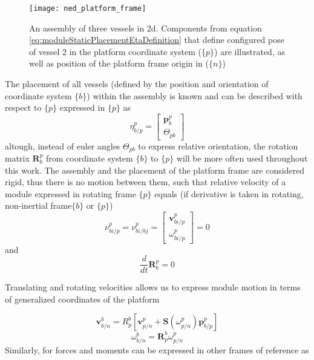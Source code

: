 \begin{figure}[H]
	\centering
	\texttt{[image: ned\_platform\_frame]}
	\caption{An assembly of three vessels in 2d. Components from equation \ref{eq:moduleStaticPlacementEtaDefinition} that define configured pose of vessel 2 in the platform coordinate system ($ \{p\}$) are illustrated, as well as position of the platform frame origin in ($ \{n\}$)}
\end{figure}

The placement of all vessels (defined by the position and orientation of coordinate system $\{b\}$) within the assembly is known and can be described with respect to $\{p\}$ expressed in $\{p\}$ as
\begin{equation}
	\eta_{b/p}^{p} = \begin{bmatrix} \textbf{p}^{p}_{b} \\[8pt]  \Theta_{pb} \end{bmatrix}
	\label{eq:moduleStaticPlacementEtaDefinition}
\end{equation}
altough, instead of euler angles $\Theta_{pb}$ to express relative orientation, the rotation matrix $\textbf{R}^{p}_{b}$ from coordinate system $\{b\}$ to $\{p\}$ will be more often used throughout this work. The assembly and the placement of the platform frame are considered rigid, thus there is no motion between them, such that relative velocity of a module expressed in rotating frame $\{p\}$ equals (if derivative is taken in rotating, non-inertial frame$\{b\}$ or $\{p\}$)
\begin{equation}
	\nu_{bi/p}^{p} = \nu_{bi/bj}^{p} = \begin{bmatrix} \textbf{v}^{p}_{bi/p} \\[8pt]  \omega^{p}_{bi/p} \end{bmatrix} = 0
	\label{eq:derivNoMotionInPlatformR}
\end{equation}
and 
\begin{equation}
	\frac{d}{dt} \textbf{R}^{p}_{b} = 0
\end{equation}

Translating and rotating velocities allows us to express module motion in terms of generalized coordinates of the platform

\begin{equation}
	\textbf{v}_{b/n}^{b} = R_{p}^{b}[ \textbf{v}_{p/n}^{p} + \textbf{S}(\omega_{p/n}^{p}) \textbf{p}_{b/p}^{p}]
	\label{eq:bodyLinearVelocityR}
\end{equation}
\begin{equation}
	\omega_{b/n}^{b} = \textbf{R}_{p}^{b}\omega_{p/n}^{p}
	\label{eq:bodyAngularVelocityR}
\end{equation}
Similarly, for forces and moments can be expressed in other frames of reference as

